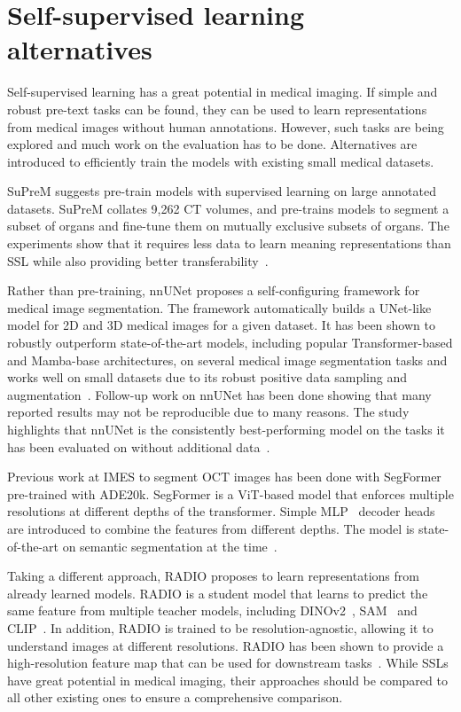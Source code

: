 \documentclass[a4paper,11pt,oneside]{report}
\begin{document}
\section{Self-supervised learning alternatives}
Self-supervised learning has a great potential in medical imaging. If simple and robust pre-text tasks can be found, they can be used to learn representations from medical images without human annotations. However, such tasks are being explored and much work on the evaluation has to be done. Alternatives are introduced to efficiently train the models with existing small medical datasets.

SuPreM suggests pre-train models with supervised learning on large annotated datasets. SuPreM collates 9,262 CT volumes, and pre-trains models to segment a subset of organs and fine-tune them on mutually exclusive subsets of organs. The experiments show that it requires less data to learn meaning representations than SSL while also providing better transferability~\cite{Li2024}.

Rather than pre-training, nnUNet proposes a self-configuring framework for medical image segmentation. The framework automatically builds a UNet-like model for 2D and 3D medical images for a given dataset. It has been shown to robustly outperform state-of-the-art models, including popular Transformer-based and Mamba-base architectures, on several medical image segmentation tasks and works well on small datasets due to its robust positive data sampling and augmentation~\cite{Isensee2020}. Follow-up work on nnUNet has been done showing that many reported results may not be reproducible due to many reasons. The study highlights that nnUNet is the consistently best-performing model on the tasks it has been evaluated on without additional data~\cite{Isensee2024}.

Previous work at IMES to segment OCT images has been done with SegFormer pre-trained with ADE20k. SegFormer is a ViT-based model that enforces multiple resolutions at different depths of the transformer. Simple MLP~\cite{Rumelhart1986} decoder heads are introduced to combine the features from different depths. The model is state-of-the-art on semantic segmentation at the time~\cite{Xie2021SegFormer}.

Taking a different approach, RADIO proposes to learn representations from already learned models. RADIO is a student model that learns to predict the same feature from multiple teacher models, including DINOv2~\cite{Oquab2024dinov}, SAM~\cite{Kirillov2023SAM} and CLIP~\cite{Radford2021CLIP}. In addition, RADIO is trained to be resolution-agnostic, allowing it to understand images at different resolutions. RADIO has been shown to provide a high-resolution feature map that can be used for downstream tasks~\cite{Ranzinger2024RADIO}. While SSLs have great potential in medical imaging, their approaches should be compared to all other existing ones to ensure a comprehensive comparison.
\end{document}
